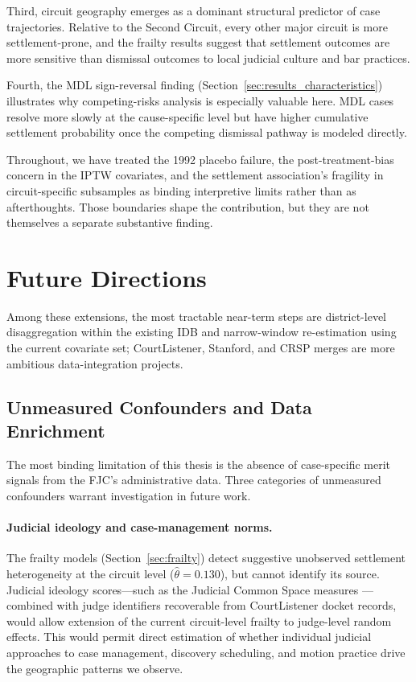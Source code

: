 Third, circuit geography emerges as a dominant structural
predictor of case trajectories. Relative to the Second
Circuit, every other major circuit is more settlement-prone,
and the frailty results suggest that settlement outcomes are
more sensitive than dismissal outcomes to local judicial
culture and bar practices.

Fourth, the MDL sign-reversal finding
(Section~\ref{sec:results_characteristics}) illustrates why
competing-risks analysis is especially valuable here. MDL
cases resolve more slowly at the cause-specific level but
have higher cumulative settlement probability once the
competing dismissal pathway is modeled directly.

Throughout, we have treated the 1992 placebo failure, the
post-treatment-bias concern in the IPTW covariates, and the
settlement association's fragility in circuit-specific
subsamples as binding interpretive limits rather than as
afterthoughts. Those boundaries shape the contribution, but
they are not themselves a separate substantive finding.

\section{Future Directions}

Among these extensions, the most tractable near-term steps
are district-level disaggregation within the existing IDB and
narrow-window re-estimation using the current covariate set;
CourtListener, Stanford, and CRSP merges are more ambitious
data-integration projects.

\subsection{Unmeasured Confounders and Data Enrichment}

The most binding limitation of this thesis is the absence of
case-specific merit signals from the FJC's administrative
data. Three categories of unmeasured confounders warrant
investigation in future work.

\paragraph{Judicial ideology and case-management norms.}
The frailty models (Section~\ref{sec:frailty}) detect
suggestive unobserved settlement heterogeneity at the
circuit level ($\hat{\theta} = 0.130$), but cannot identify its source.
Judicial ideology scores---such as the Judicial Common Space
measures \citep{epstein2007}---combined with judge
identifiers recoverable from CourtListener docket records,
would allow extension of the current circuit-level frailty
to judge-level random effects. This would permit direct
estimation of whether individual judicial approaches to case
management, discovery scheduling, and motion practice drive
the geographic patterns we observe.

